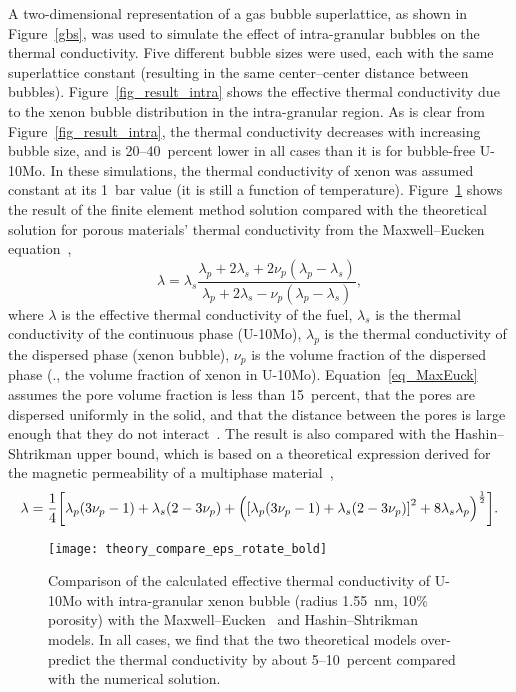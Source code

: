 A two-dimensional representation of a gas bubble superlattice, as shown in
Figure~\ref{gbs}, was used to simulate the effect of intra-granular bubbles on the thermal conductivity.
Five different bubble sizes were used, each with the same superlattice
constant (resulting in the same center--center distance between bubbles).
Figure~\ref{fig_result_intra} shows the effective thermal conductivity due to the xenon bubble distribution in the intra-granular region.
As is clear from Figure~\ref{fig_result_intra}, the thermal conductivity decreases with increasing bubble size, and is 20--40~percent lower in all cases than it is for bubble-free U-10Mo. In these simulations, the thermal conductivity of xenon was assumed constant at its 1~bar value (it is still a function of temperature).
Figure~\ref{fig_compare} shows the result of the finite element method solution compared with the theoretical solution for porous materials' thermal conductivity from the Maxwell--Eucken equation~\cite{maxwell1881treatise}, 
\begin{equation}
	\lambda = \lambda_s\frac{\lambda_p+2\lambda_s+2\nu_p(\lambda_p-\lambda_s)}{\lambda_p+2\lambda_s-\nu_p(\lambda_p-\lambda_s)},
	\label{eq_MaxEuck}
\end{equation}
where $\lambda$ is the effective thermal conductivity of the fuel, $\lambda_s$ is the thermal conductivity of the continuous phase (U-10Mo), $\lambda_p$ is the thermal conductivity of the dispersed phase (xenon bubble), $\nu_p$ is the volume fraction of the dispersed phase (\ie., the volume fraction of xenon in U-10Mo). Equation~\eqref{eq_MaxEuck} assumes the pore volume fraction is less than 15~percent, that the pores are dispersed uniformly in the solid, and that the distance between the pores is large enough that they do not interact~\cite{clark2003monolithic,smith2013thermal}. The result is also compared with the Hashin--Shtrikman upper bound, which is based on a theoretical expression derived for the magnetic permeability of a multiphase material~\cite{hashin1962variational},
\begin{equation}
\lambda = \frac{1}{4}\biggl[ \lambda_p(3\nu_p-1) + \lambda_s(2-3\nu_p)+ \Bigl( \left[ \lambda_p (3\nu_p -1) + \lambda_s(2-3\nu_p) \right]^2 + 8\lambda_s\lambda_p \Bigr)^{\frac{1}{2}}
    \biggr].
\label{eq:Hash-Sht}
\end{equation}

\begin{figure}%
	\centering
	\texttt{[image: theory\_compare\_eps\_rotate\_bold]}
	\caption[Comparison of the calculated effective thermal conductivity of \mbox{U-10Mo} with intra-granular xenon bubble (radius 1.55~nm, 10$\%$ porosity) with the Maxwell--Eucken and Hashin--Shtrikman models]{Comparison of the calculated effective thermal conductivity of \mbox{U-10Mo} with intra-granular xenon bubble (radius 1.55~nm, 10$\%$ porosity) with the Maxwell--Eucken~\cite{maxwell1881treatise} and Hashin--Shtrikman~\cite{hashin1962variational} models. In all cases, we find that the
      two theoretical models over-predict the thermal conductivity by about
      5--10~percent compared with the numerical solution.}
	\label{fig_compare}
\end{figure}

